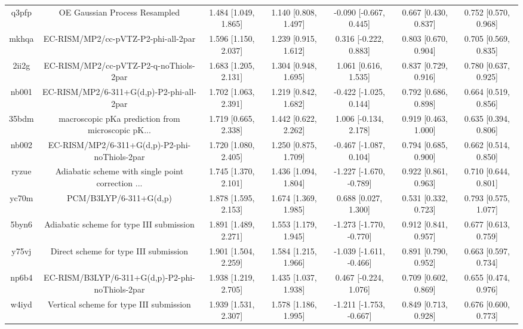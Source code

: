 \documentclass{article}
\begin{document}
\begin{center}
\begin{longtable}{|ccccccc|}
 q3pfp &                      OE Gaussian Process Resampled &  1.484 [1.049, 1.865] &  1.140 [0.808, 1.497] &   -0.090 [-0.667, 0.445] &  0.667 [0.430, 0.837] &   0.752 [0.570, 0.968] \\
 mkhqa &                EC-RISM/MP2/cc-pVTZ-P2-phi-all-2par &  1.596 [1.150, 2.037] &  1.239 [0.915, 1.612] &    0.316 [-0.222, 0.883] &  0.803 [0.670, 0.904] &   0.705 [0.569, 0.835] \\
 2ii2g &             EC-RISM/MP2/cc-pVTZ-P2-q-noThiols-2par &  1.683 [1.205, 2.131] &  1.304 [0.948, 1.695] &     1.061 [0.616, 1.535] &  0.837 [0.729, 0.916] &   0.780 [0.637, 0.925] \\
 nb001 &           EC-RISM/MP2/6-311+G(d,p)-P2-phi-all-2par &  1.702 [1.063, 2.391] &  1.219 [0.842, 1.682] &   -0.422 [-1.025, 0.144] &  0.792 [0.686, 0.898] &   0.664 [0.519, 0.856] \\
 35bdm &  macroscopic pKa prediction from microscopic pK... &  1.719 [0.665, 2.338] &  1.442 [0.622, 2.262] &    1.006 [-0.134, 2.178] &  0.919 [0.463, 1.000] &   0.635 [0.394, 0.806] \\
 nb002 &      EC-RISM/MP2/6-311+G(d,p)-P2-phi-noThiols-2par &  1.720 [1.080, 2.405] &  1.250 [0.875, 1.709] &   -0.467 [-1.087, 0.104] &  0.794 [0.685, 0.900] &   0.662 [0.514, 0.850] \\
 ryzue &  Adiabatic scheme with single point correction ... &  1.745 [1.370, 2.101] &  1.436 [1.094, 1.804] &  -1.227 [-1.670, -0.789] &  0.922 [0.861, 0.963] &   0.710 [0.644, 0.801] \\
 yc70m &                             PCM/B3LYP/6-311+G(d,p) &  1.878 [1.595, 2.153] &  1.674 [1.369, 1.985] &     0.688 [0.027, 1.300] &  0.531 [0.332, 0.723] &   0.793 [0.575, 1.077] \\
 5byn6 &           Adiabatic scheme for type III submission &  1.891 [1.489, 2.271] &  1.553 [1.179, 1.945] &  -1.273 [-1.770, -0.770] &  0.912 [0.841, 0.957] &   0.677 [0.613, 0.759] \\
 y75vj &              Direct scheme for type III submission &  1.901 [1.504, 2.259] &  1.584 [1.215, 1.966] &  -1.039 [-1.611, -0.466] &  0.891 [0.790, 0.952] &   0.663 [0.597, 0.734] \\
 np6b4 &    EC-RISM/B3LYP/6-311+G(d,p)-P2-phi-noThiols-2par &  1.938 [1.219, 2.705] &  1.435 [1.037, 1.938] &    0.467 [-0.224, 1.076] &  0.709 [0.602, 0.869] &   0.655 [0.474, 0.976] \\
 w4iyd &            Vertical scheme for type III submission &  1.939 [1.531, 2.307] &  1.578 [1.186, 1.995] &  -1.211 [-1.753, -0.667] &  0.849 [0.713, 0.928] &   0.676 [0.600, 0.773] \\

\end{longtable}
\end{center}
\end{document}
